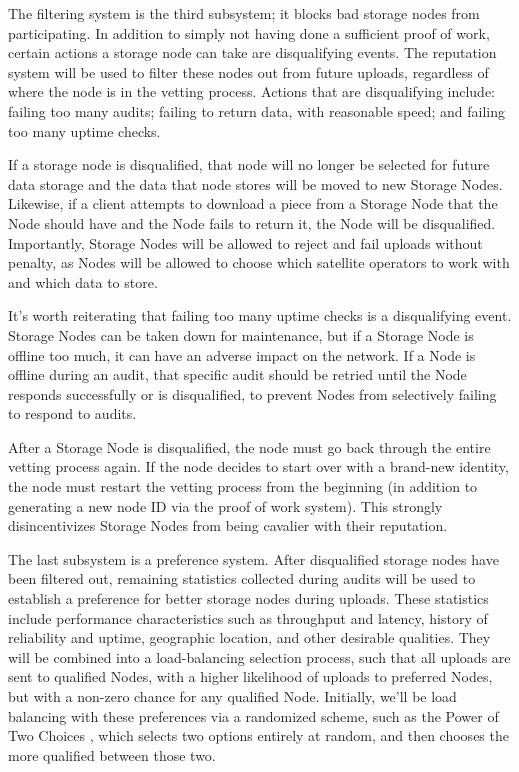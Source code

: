 \documentclass[8pt,fleqn,openany]{book}
\begin{document}
The filtering system is the third subsystem; it blocks bad storage nodes from
participating.
In addition to simply not having done a sufficient proof of work,
certain actions a storage node can take are disqualifying events. The
reputation system will be used to filter these nodes out from future uploads,
regardless of where the node is in the vetting process.
Actions that are disqualifying include: failing too many audits;
failing to return data, with reasonable speed; and failing too many uptime
checks.

If a storage node is disqualified, that node will no longer be selected for
future data storage and the data that node stores will be moved to new
Storage Nodes.
Likewise, if a client attempts to download a piece from a Storage Node that
the Node should have and the Node fails to return it, the
Node will be disqualified. Importantly, Storage Nodes will be allowed to reject
and fail uploads without penalty, as Nodes will be allowed to choose which
satellite operators to work with and which data to store.

It's worth reiterating that failing too many uptime checks is a disqualifying
event. Storage Nodes can be taken down for maintenance, but if a Storage Node
is offline too much, it can have an adverse impact on the network. If a Node
is offline during an audit, that specific audit should be retried until the Node
responds successfully or is disqualified, to prevent Nodes from selectively
failing to respond to audits.

After a Storage Node is disqualified, the node must go back through the entire
vetting process again. If the node decides to start over with a brand-new
identity, the node must restart the vetting process from the beginning (in
addition to generating a new node ID via the proof of work system). This
strongly disincentivizes Storage Nodes from being cavalier with their
reputation.

The last subsystem is a preference system. After disqualified storage nodes
have been filtered out, remaining statistics collected during audits
will be used to establish a preference for better storage nodes during uploads.
These statistics include performance characteristics such as throughput and
latency, history of reliability and uptime, geographic location, and other
desirable qualities.
They will be combined into a load-balancing selection process, such
that all uploads are sent to qualified Nodes, with a higher likelihood of
uploads to preferred Nodes, but with a non-zero chance for any qualified Node.
Initially, we'll be load balancing with these preferences via a randomized
scheme, such as the Power of Two Choices \cite{power-of-two-choices}, which
selects two options entirely at random, and then chooses the more qualified
between those two.
\end{document}
